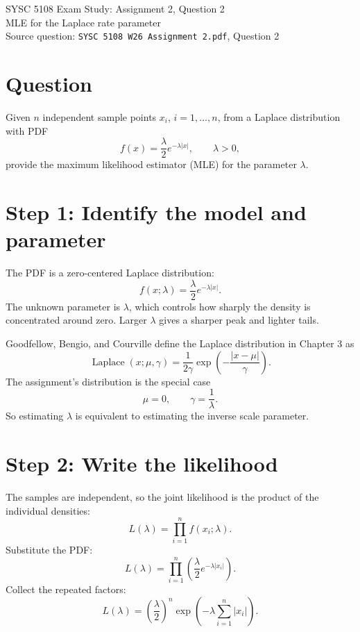 \documentclass[11pt]{article}
\begin{document}
\begin{center}
{\Large SYSC 5108 Exam Study: Assignment 2, Question 2}\\
\vspace{0.3em}
{\large MLE for the Laplace rate parameter}\\
\vspace{0.3em}
Source question: \texttt{SYSC 5108 W26 Assignment 2.pdf}, Question 2
\end{center}

\section*{Question}

Given $n$ independent sample points $x_i$, $i=1,\ldots,n$, from a Laplace distribution with PDF
\[
f(x)=\frac{\lambda}{2}e^{-\lambda |x|},
\qquad \lambda>0,
\]
provide the maximum likelihood estimator (MLE) for the parameter $\lambda$.

\section*{Step 1: Identify the model and parameter}

The PDF is a zero-centered Laplace distribution:
\[
f(x;\lambda)=\frac{\lambda}{2}e^{-\lambda |x|}.
\]
The unknown parameter is $\lambda$, which controls how sharply the density is concentrated around zero. Larger $\lambda$ gives a sharper peak and lighter tails.

Goodfellow, Bengio, and Courville define the Laplace distribution in Chapter 3 as
\[
\operatorname{Laplace}(x;\mu,\gamma)
=
\frac{1}{2\gamma}\exp\left(-\frac{|x-\mu|}{\gamma}\right).
\]
The assignment's distribution is the special case
\[
\mu=0,\qquad \gamma=\frac{1}{\lambda}.
\]
So estimating $\lambda$ is equivalent to estimating the inverse scale parameter.

\section*{Step 2: Write the likelihood}

The samples are independent, so the joint likelihood is the product of the individual densities:
\[
L(\lambda)
=
\prod_{i=1}^{n} f(x_i;\lambda).
\]
Substitute the PDF:
\[
L(\lambda)
=
\prod_{i=1}^{n}\left(\frac{\lambda}{2}e^{-\lambda |x_i|}\right).
\]
Collect the repeated factors:
\[
L(\lambda)
=
\left(\frac{\lambda}{2}\right)^n
\exp\left(-\lambda\sum_{i=1}^{n}|x_i|\right).
\]
\end{document}
